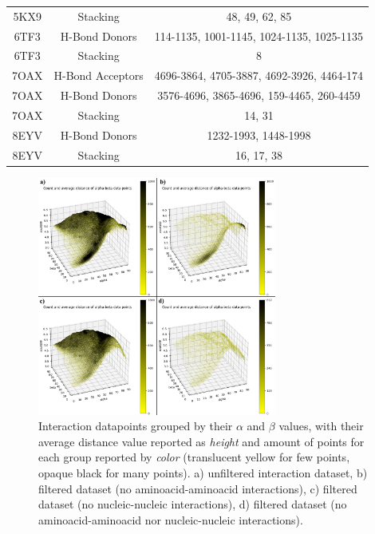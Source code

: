 \begin{table}[H]
\begin{tabular}{ccc}
    5KX9 & Stacking         & 48, 49, 62, 85                                                \\
    6TF3 & H-Bond Donors    & 114-1135, 1001-1145, 1024-1135, 1025-1135                     \\
    6TF3 & Stacking         & 8                                                             \\
    7OAX & H-Bond Acceptors & 4696-3864, 4705-3887, 4692-3926, 4464-174                     \\
    7OAX & H-Bond Donors    & 3576-4696, 3865-4696, 159-4465, 260-4459                      \\
    7OAX & Stacking         & 14, 31                                                        \\
    8EYV & H-Bond Donors    & 1232-1993, 1448-1998                                          \\
    8EYV & Stacking         & 16, 17, 38                                                    \\ \hline
  \end{tabular}
\end{table}


\begin{figure}[H]
  \centering
  \includegraphics[width=0.7\textwidth]{figures/appendix/stacking_sampling.png}
  \caption{\label{fig:appx2/stacking_sampling} Interaction datapoints grouped by their $\alpha$ and $\beta$ values, with their average distance value reported as \textit{height} and amount of points for each group reported by \textit{color} (translucent yellow for few points, opaque black for many points). a) unfiltered interaction dataset, b) filtered dataset (no aminoacid-aminoacid interactions), c) filtered dataset (no nucleic-nucleic interactions), d) filtered dataset (no aminoacid-aminoacid nor nucleic-nucleic interactions).}
\end{figure}


